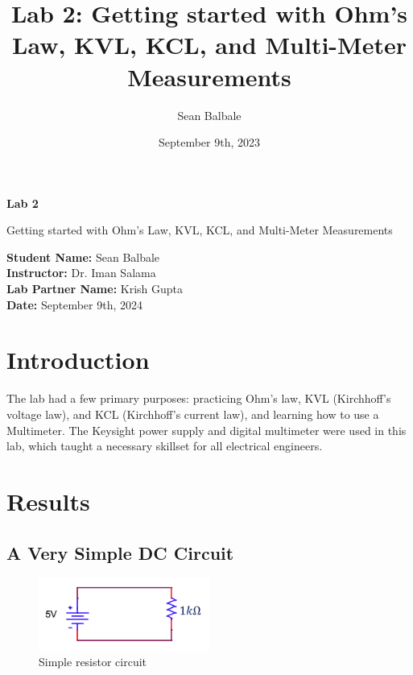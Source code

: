 \documentclass{article}
\title{Lab 2: Getting started with Ohm's Law, KVL, KCL, and Multi-Meter
Measurements}
\author{Sean Balbale}
\date{September 9th, 2023}
\begin{document}
\begin{titlepage}
	\begin{center}
		\vspace*{1in}

		\Huge
		\textbf{Lab 2}

		\LARGE
		Getting started with Ohm’s Law, KVL, KCL, and Multi-Meter Measurements

		\vspace{3 in}

		\textbf{Student Name:} Sean Balbale
		\\ \textbf{Instructor:} Dr. Iman Salama
		\\ \textbf{Lab Partner Name:} Krish Gupta
		\\ \textbf{Date:} September 9th, 2024

		\vfill


	\end{center}
\end{titlepage}

\newpage


\section{Introduction}
The lab had a few primary purposes: practicing Ohm’s law,
KVL (Kirchhoff's voltage law), and KCL (Kirchhoff's current law),
and learning how to use a Multimeter. The Keysight power supply
and digital multimeter were used in this lab, which taught a
necessary skillset for all electrical engineers.

\section{Results}


\subsection{A Very Simple DC Circuit}
\begin{figure}[H]
	\centering
	\includegraphics[width=0.5\textwidth]{simple_resistor_circuit_for_part1.png}
	\caption{Simple resistor circuit}
	\label{fig:fig1}
\end{figure}
\end{document}
